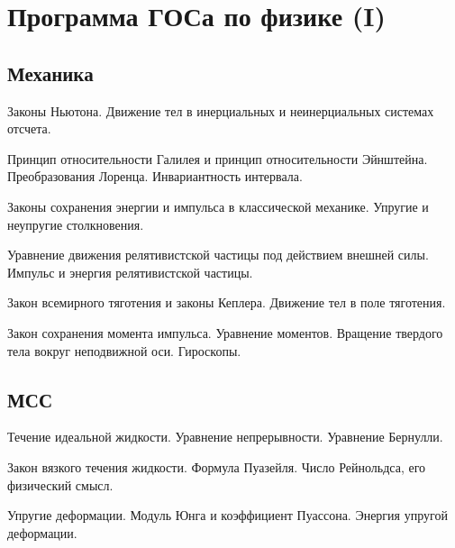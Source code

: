 \section*{Программа ГОСа по физике (I)}

\subsection*{Механика}
\begin{enumerate*}
\item Законы Ньютона. Движение тел в инерциальных и неинерциальных системах отсчета.
\item Принцип относительности Галилея и принцип относительности Эйнштейна. Преобразования Лоренца. Инвариантность интервала.
\item Законы сохранения энергии и импульса в классической механике. Упругие и неупругие столкновения.
\item Уравнение движения релятивистской частицы под действием внешней силы. Импульс и энергия
релятивистской частицы.
\item Закон всемирного тяготения и законы Кеплера. Движение тел в поле тяготения.
\item Закон сохранения момента импульса. Уравнение моментов. Вращение твердого тела вокруг неподвижной оси. Гироскопы.
\end{enumerate*}


\subsection*{МСС}
\begin{enumerate*}
\setcounter{enumi}{6}
\item Течение идеальной жидкости. Уравнение непрерывности. Уравнение Бернулли.
\item Закон вязкого течения жидкости. Формула Пуазейля. Число Рейнольдса, его физический смысл.
\item Упругие деформации. Модуль Юнга и коэффициент Пуассона. Энергия упругой деформации.

\end{enumerate*}


